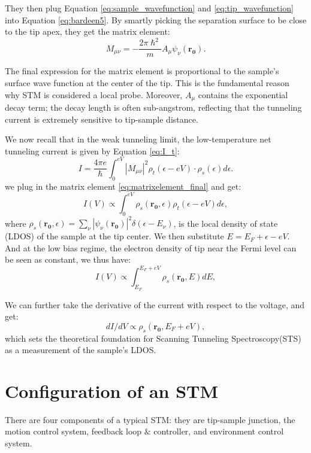 They then plug Equation \ref{eq:sample_wavefunction} and \ref{eq:tip_wavefunction} into Equation \ref{eq:bardeen5}. By smartly picking the separation surface to be close to the tip apex, they get the matrix element: 
\begin{equation}
	\label{eq:matrixelement_final}
	M_{\mu \nu} = -\frac{2\pi\hslash^2}{m}A_{\mu}\psi_{\nu}(\mathbf{r_0}).
\end{equation}

The final expression for the matrix element is proportional to the sample's surface wave function at the center of the tip. This is the fundamental reason why \ac{STM} is considered a local probe. Moreover, $A_{\mu}$ contains the exponential decay term; the decay length is often sub-angstrom, reflecting that the tunneling current is extremely sensitive to tip-sample distance. 

We now recall that in the weak tunneling limit, the low-temperature net tunneling current is given by Equation \ref{eq:I_t}:
\begin{equation}
	I = \frac{4\pi e}{\hslash} \int_0^{eV}|M_{\mu \nu}|^2 \rho_t(\epsilon - eV) \cdot \rho_s(\epsilon) d\epsilon.
\end{equation}
we plug in the matrix element \ref{eq:matrixelement_final} and get:
\begin{equation}
	I(V) \propto \int_0^{eV}  \rho_s(\mathbf{r_0},\epsilon) \rho_t(\epsilon-eV) d\epsilon,
\end{equation}
where $\rho_s(\mathbf{r_0},\epsilon) = \sum_{\nu} |\psi_{\nu}(\mathbf{r_0})|^2 \delta(\epsilon - E_{\nu})$, is the local density of state (LDOS) of the sample at the tip center. We then substitute $E = E_F+ \epsilon - eV$. And at the low bias regime, the electron density of tip near the Fermi level can be seen as constant, we thus have: 
\begin{equation}
	I(V) \propto \int_{E_F}^{E_F+ eV}  \rho_s(\mathbf{r_0},E) dE,
\end{equation}

We can further take the derivative of the current with respect to the voltage, and get: 
\begin{equation}
	dI/dV \propto \rho_s(\mathbf{r_0},E_F + eV),
\end{equation}
which sets the theoretical foundation for Scanning Tunneling Spectroscopy(STS) as a measurement of the sample's \ac{LDOS}. 

\section{Configuration of an STM}
There are four components of a typical STM: they are tip-sample junction, the motion control system, feedback loop $\&$ controller, and environment control system. 

